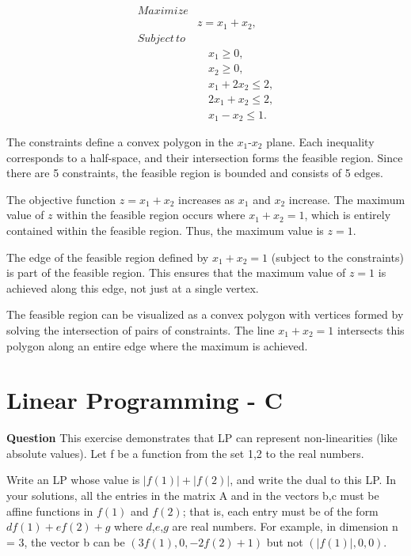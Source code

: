 \documentclass[12pt]{article}
\begin{document}
\[
\begin{aligned}
Maximize& \\
&z = x_1 + x_2, \\
Subject \, to& \\
& \quad x_1 \geq 0, \\
& \quad x_2 \geq 0, \\
& \quad x_1 + 2x_2 \leq 2, \\
& \quad 2x_1 + x_2 \leq 2, \\
& \quad x_1 - x_2 \leq 1.
\end{aligned}
\]


The constraints define a convex polygon in the \(x_1\)-\(x_2\) plane. Each inequality corresponds to a half-space, and their intersection forms the feasible region. Since there are 5 constraints, the feasible region is bounded and consists of 5 edges.

The objective function \(z = x_1 + x_2\) increases as \(x_1\) and \(x_2\) increase. The maximum value of \(z\) within the feasible region occurs where \(x_1 + x_2 = 1\), which is entirely contained within the feasible region. Thus, the maximum value is \(z = 1\).

The edge of the feasible region defined by \(x_1 + x_2 = 1\) (subject to the constraints) is part of the feasible region. This ensures that the maximum value of \(z = 1\) is achieved along this edge, not just at a single vertex.

The feasible region can be visualized as a convex polygon with vertices formed by solving the intersection of pairs of constraints. The line \(x_1 + x_2 = 1\) intersects this polygon along an entire edge where the maximum is achieved.

\section{Linear Programming - C}
\textbf{Question}
This exercise demonstrates that LP can represent non-linearities (like absolute values). Let f be a function from the set {1,2} to the real numbers. 

Write an LP whose value is $|f(1)|+|f(2)|$, and write the dual to this LP. In your solutions, all the entries in the matrix A and in the vectors b,c must be affine functions in $f(1)$ and $f(2)$; that is, each entry must be of the form $d f(1) + e f(2) + g$ where $d$,$e$,$g$ are real numbers. For example, in dimension n = 3, the vector b can be $(3 f(1), 0, -2f(2)+1)$ but not $(|f(1)|,0,0)$. 
\end{document}
